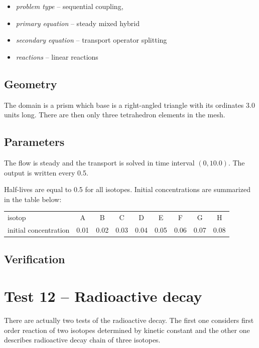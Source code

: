 \begin{itemize} 
    \item \emph{problem type} -- sequential coupling, 
    \item \emph{primary equation} -- steady mixed hybrid
    \item \emph{secondary equation} -- transport operator splitting
    \item \emph{reactions} -- linear reactions
  \end{itemize}

\subsection*{Geometry}
The domain is a prism which base is a right-angled triangle with its ordinates 3.0 units long. There are then only three tetrahedron elements in the mesh.

\subsection*{Parameters}
The flow is steady and the transport is solved in time interval $(0,10.0)$. The output is written every 0.5.

Half-lives are equal to 0.5 for all isotopes. Initial concentrations are summarized in the table below:
  \begin{center}
    \begin{tabular}[c]{|l|c|c|c|c|c|c|c|c|}
      \hline
      isotop & A & B  & C & D & E & F & G & H \\[4pt]
      initial concentration & 0.01 & 0.02 & 0.03 & 0.04 & 0.05 & 0.06 & 0.07 & 0.08 \\[4pt]
      \hline
    \end{tabular}
  \end{center}


\subsection*{Verification}



\section{Test 12 -- Radioactive decay}
There are actually two tests of the radioactive decay. The first one considers first order reaction of two isotopes determined by kinetic constant and the other one describes radioactive decay chain of three isotopes.

